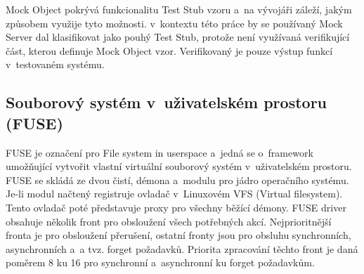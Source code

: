 Mock Object pokrývá funkcionalitu Test Stub vzoru a na vývojáři záleží, jakým způsobem využije tyto možnosti. v kontextu této práce by se používaný Mock Server dal
klasifikovat jako pouhý Test Stub, protože není využívaná verifikující část, kterou definuje Mock Object vzor.\cite[524--525]{UnitPatternsTest} Verifikovaný je pouze
výstup funkcí v testovaném systému.

\subsection{Souborový systém v uživatelském prostoru (FUSE)}
\label{sec:fuse}

FUSE je označení pro File system in userspace a jedná se o framework umožňující vytvořit vlastní virtuální souborový systém v uživatelském prostoru. FUSE se skládá
ze dvou čistí, démona a modulu pro jádro operačního systému. Je-li modul načtený registruje ovladač v Linuxovém VFS (Virtual filesystem). Tento ovladač poté
představuje proxy pro všechny běžící démony. FUSE driver obsahuje několik front pro obsloužení všech potřebných akcí. Nejprioritnější fronta je pro obsloužení
přerušení, ostatní fronty jsou pro obsluhu synchronních, asynchronních a a tvz. forget požadavků. Priorita zpracování těchto front je daná poměrem 8 ku 16 pro 
synchronní a asynchronní ku forget požadavkům.\cite{FuseOrNotToFuse}

